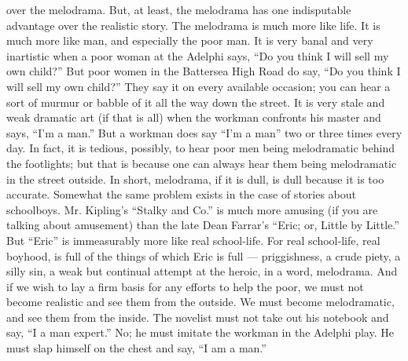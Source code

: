over the melodrama. But, at least, the melodrama has one indisputable advantage over the realistic story. The melodrama is much more like life. It is much more like man, and especially the poor man. It is very banal and very inartistic when a poor woman at the Adelphi says, “Do you think I will sell my own child?” But poor women in the Battersea High Road do say, “Do you think I will sell my own child?” They say it on every available occasion; you can hear a sort of murmur or babble of it all the way down the street. It is very stale and weak dramatic art (if that is all) when the workman confronts his master and says, “I’m a man.” But a workman does say “I’m a man” two or three times every day. In fact, it is tedious, possibly, to hear poor men being melodramatic behind the footlights; but that is because one can always hear them being melodramatic in the street outside. In short, melodrama, if it is dull, is dull because it is too accurate. Somewhat the same problem exists in the case of stories about schoolboys. Mr. Kipling’s “Stalky and Co.” is much more amusing (if you are talking about amusement) than the late Dean Farrar’s “Eric; or, Little by Little.” But “Eric” is immeasurably more like real school-life. For real school-life, real boyhood, is full of the things of which Eric is full — priggishness, a crude piety, a silly sin, a weak but continual attempt at the heroic, in a word, melodrama. And if we wish to lay a firm basis for any efforts to help the poor, we must not become realistic and see them from the outside. We must become melodramatic, and see them from the inside. The novelist must not take out his notebook and say, “I a man expert.” No; he must imitate the workman in the Adelphi play. He must slap himself on the chest and say, “I am a man.”


